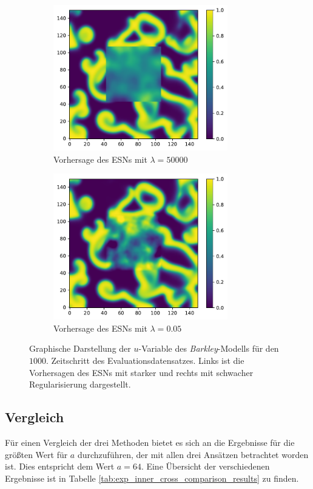\begin{figure}[h]
	\centering
	\begin{subfigure}{.5\textwidth}
		\centering
		\includegraphics[height=2.5in]{figures/results/inner_cross_prediction/barkley_u_inner_esn_high_penalty.pdf}
		\setcapmargin[1cm]{0.5cm}
		\caption{Vorhersage des \textsc{ESN}s mit $\lambda=50000$}
	\end{subfigure}%
	\begin{subfigure}{.5\textwidth}
		\centering
		\includegraphics[height=2.5in]{figures/results/inner_cross_prediction/barkley_u_inner_esn_low_penalty.pdf}
		\setcapmargin[1cm]{0.5cm}
  		\caption{Vorhersage des \textsc{ESN}s mit $\lambda=0.05$}
	\end{subfigure}
	\caption{Graphische Darstellung der $u$-Variable des \textit{Barkley}-Modells für den $1000$. Zeitschritt des Evaluationsdatensatzes. Links ist die Vorhersagen des \textsc{ESN}s mit starker und rechts mit schwacher Regularisierung dargestellt.}
	\label{fig:exp_inner_cross_barkley_esn_comparison}
\end{figure} 

\subsection{Vergleich}
Für einen Vergleich der drei Methoden bietet es sich an die Ergebnisse für die größten Wert für $a$ durchzuführen, der mit allen drei Ansätzen betrachtet worden ist. Dies entspricht dem Wert $a=64$. Eine Übersicht der verschiedenen Ergebnisse ist in Tabelle \ref{tab:exp_inner_cross_comparison_results} zu finden.

